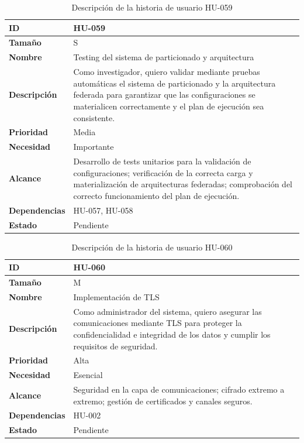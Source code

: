\documentclass{report}
\begin{document}
\begin{table}[H]
\centering
\caption{Descripción de la historia de usuario HU-059}
\label{tab:hu059}
\begin{tabular}{|l|p{12cm}|}
\hline
\textbf{ID} & HU-059 \\ \hline
\textbf{Tamaño} & S \\ \hline
\textbf{Nombre} & Testing del sistema de particionado y arquitectura \\ \hline
\textbf{Descripción} &
Como investigador, quiero validar mediante pruebas automáticas el sistema de particionado y la arquitectura federada para garantizar que las configuraciones se materialicen correctamente y el plan de ejecución sea consistente. \\ \hline
\textbf{Prioridad} & Media \\ \hline
\textbf{Necesidad} & Importante \\ \hline
\textbf{Alcance} &
Desarrollo de tests unitarios para la validación de configuraciones; verificación de la correcta carga y materialización de arquitecturas federadas; comprobación del correcto funcionamiento del plan de ejecución. \\ \hline
\textbf{Dependencias} &
HU-057, HU-058 \\ \hline
\textbf{Estado} & Pendiente \\ \hline
\end{tabular}
\end{table}


\begin{table}[H]
\centering
\caption{Descripción de la historia de usuario HU-060}
\label{tab:hu060}
\begin{tabular}{|l|p{12cm}|}
\hline
\textbf{ID} & HU-060 \\ \hline
\textbf{Tamaño} & M \\ \hline
\textbf{Nombre} & Implementación de TLS \\ \hline
\textbf{Descripción} &
Como administrador del sistema, quiero asegurar las comunicaciones mediante TLS para proteger la confidencialidad e integridad de los datos y cumplir los requisitos de seguridad. \\ \hline
\textbf{Prioridad} & Alta \\ \hline
\textbf{Necesidad} & Esencial \\ \hline
\textbf{Alcance} &
Seguridad en la capa de comunicaciones; cifrado extremo a extremo; gestión de certificados y canales seguros. \\ \hline
\textbf{Dependencias} & HU-002 \\ \hline
\textbf{Estado} & Pendiente \\ \hline
\end{tabular}
\end{table}
\end{document}

